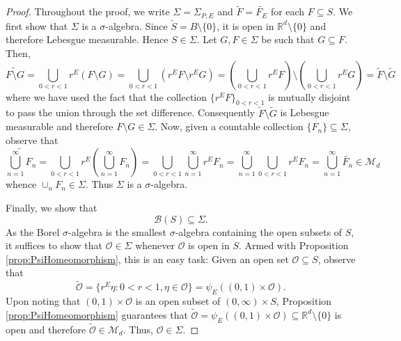 \documentclass[11pt, letter]{book}
\begin{document}
\begin{proof}
Throughout the proof, we write $\Sigma=\Sigma_{P,E}$ and $\widetilde{F}=\widetilde{F_E}$ for each $F\subseteq S$.
We first show that $\Sigma$ is a $\sigma$-algebra. Since $\widetilde S=B\setminus\{0\}$, it is open in $\mathbb{R}^d\setminus\{0\}$ and therefore Lebesgue measurable. Hence $S\in \Sigma$. Let $G, F\in \Sigma$ be such that $G\subseteq F$. Then,
\begin{equation*}
\widetilde{F\setminus G}=\bigcup_{0<r<1}r^E\left(F\setminus G\right)=\bigcup_{0<r<1}\left(r^EF\setminus r^E G\right)=\left(\bigcup_{0<r<1}r^E F\right)\setminus\left(\bigcup_{0<r<1}r^E G\right)=\widetilde F\setminus \widetilde G
\end{equation*}
where we have used the fact that the collection $\{r^E F\}_{0<r<1}$ is mutually disjoint to pass the union through the set difference. Consequently $\widetilde F\setminus \widetilde{G}$ is Lebesgue measurable and therefore $F\setminus G\in \Sigma$.  Now, given a countable collection $\{F_n\}\subseteq \Sigma$, observe that
\begin{equation*}
    \widetilde{\bigcup_{n=1}^\infty F_n}= \bigcup_{0<r<1}r^E \left(\bigcup_{n=1}^\infty F_n\right)= \bigcup_{0 <r< 1}  \bigcup_{n=1}^\infty  r^E F_n =\bigcup_{n=1}^\infty \bigcup_{0 <r < 1}  r^E F_n =\bigcup_{n=1}^\infty \widetilde{F_n} \in \mathcal{M}_d
\end{equation*}
whence $\cup_n F_n\in \Sigma$. Thus $\Sigma$ is a $\sigma$-algebra. 

Finally, we show that
\begin{equation*}
\mathcal{B}(S)\subseteq\Sigma.
\end{equation*}
As the Borel $\sigma$-algebra is the smallest $\sigma$-algebra containing the open subsets of $S$, it suffices to show that $\mathcal{O}\in \Sigma$ whenever $\mathcal{O}$ is open in $S$. Armed with Proposition \ref{prop:PsiHomeomorphism}, this is an easy task: Given an open set $\mathcal{O}\subseteq S$, observe that
\begin{equation*}
\widetilde{\mathcal{O}}=\{r^E\eta:0<r<1,\eta\in\mathcal{O}\}=\psi_E((0,1)\times\mathcal{O}).
\end{equation*}
Upon noting that $(0,1)\times\mathcal{O}$ is an open subset of $(0,\infty)\times S$, Proposition \ref{prop:PsiHomeomorphism} guarantees that $\widetilde{\mathcal{O}}=\psi_E((0,1)\times\mathcal{O})\subseteq\mathbb{R}^d\setminus\{0\}$ is open and therefore $\widetilde{\mathcal{O}} \in \mathcal{M}_d$. Thus, $\mathcal{O}\in \Sigma$.
\end{proof}
\end{document}

